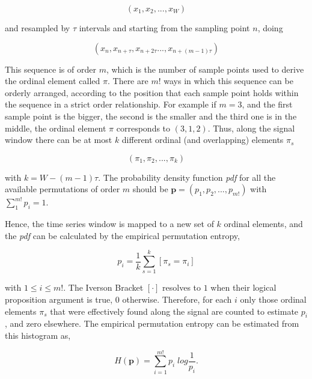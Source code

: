 \documentclass[brainsci,article,submit,moreauthors,pdftex,10pt,a4paper]{mdpi}
\begin{document}
\begin{equation}
(x_1,x_2,...,x_{W})
\label{eq:pesignal}
\end{equation}

and resampled by $\tau$ intervals and starting from the sampling point $n$, doing

\begin{equation}
(x_n,x_{n+\tau},x_{n+2 \tau}...,x_{n+(m-1)\tau})
\label{eq:pe2}
\end{equation}

This sequence is of order $m$, which is the number of sample points used to derive the ordinal element called $\pi$. There are $m!$ ways in which this sequence can be orderly arranged, according to the position that each sample point holds within the sequence in a strict order relationship.  For example if $m=3$, and the first sample point is the bigger, the second is the smaller and the third one is in the middle, the ordinal element $\pi$ corresponds to $(3,1,2)$. Thus, along the signal window there can be at most $k$ different ordinal (and overlapping) elements $\pi_{s}$

\begin{equation}
(\pi_{1},\pi_{2},...,\pi_{k})
\label{eq:pe3}
\end{equation}

\noindent with $k = W-(m-1) \tau$.  The probability density function \textit{pdf} for all the available permutations of order $m$ should be $ \textbf{p} = (p_1,p_2,...,p_{m!}) $ with $ \sum_{1}^{m!} p_{i} = 1 $.

Hence, the time series window is mapped to a new set of $k$ ordinal elements, and the \textit{pdf} can be calculated by the empirical permutation entropy,

\begin{equation}
p_i = \frac{1}{k} \sum_{s=1}^{k} \left[ \pi_{s} = \pi_{i} \right]
\label{eq:pe4}
\end{equation}

\noindent with $1 \leq i \leq m!$. The Iverson Bracket $ \left[ \cdot \right] $ resolves to $1$ when their logical proposition argument is true, $0$ otherwise. Therefore, for each $i$ only those ordinal elements $\pi_{s}$ that were effectively found along the signal are counted to estimate $p_i$, and zero elsewhere.  The empirical permutation entropy can be estimated from this histogram as,

\begin{equation}
H(\textbf{p}) = \sum_{i=1}^{m!} p_{i} \; log \frac{1}{p_{i}}.
\label{eq:pe5}
\end{equation}
\end{document}
